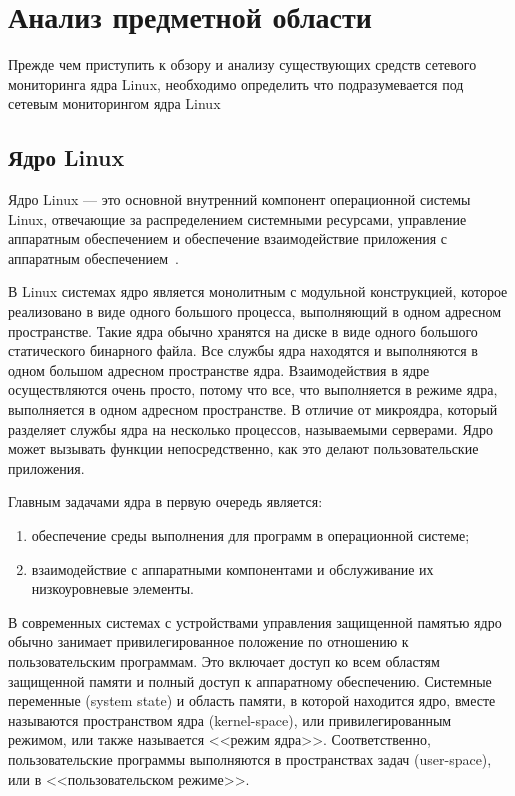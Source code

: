 \chapter{Анализ предметной области}

Прежде чем приступить к обзору и анализу существующих средств сетевого мониторинга ядра Linux, необходимо определить что подразумевается под сетевым мониторингом ядра Linux

\section{Ядро Linux}
Ядро Linux --- это основной внутренний компонент операционной системы Linux, отвечающие за распределением системными ресурсами, управление аппаратным обеспечением и обеспечение взаимодействие приложения с аппаратным обеспечением~\cite{kernel_linux_robert}.

В Linux системах ядро является монолитным с модульной конструкцией, которое реализовано в виде одного большого процесса, выполняющий в одном адресном пространстве.
Такие ядра обычно хранятся на диске в виде одного большого статического бинарного файла.
Все службы ядра находятся и выполняются в одном большом адресном пространстве ядра.
Взаимодействия в ядре осуществляются очень просто, потому что все, что выполняется в режиме ядра, выполняется в одном адресном пространстве.
В отличие от микроядра, который разделяет службы ядра на несколько процессов, называемыми серверами.
Ядро может вызывать функции непосредственно, как это делают пользовательские приложения.

Главным задачами ядра в первую очередь является:
\begin{enumerate}
	\item обеспечение среды выполнения для программ в операционной системе;
	\item взаимодействие с аппаратными компонентами и обслуживание их низкоуровневые элементы.
\end{enumerate}

В современных системах с устройствами управления защищенной памятью ядро обычно занимает привилегированное положение по отношению к пользовательским программам. Это включает доступ ко всем областям защищенной памяти и полный доступ к аппаратному обеспечению. Системные переменные (system state) и область памяти, в которой находится ядро, вместе называются пространством ядра (kernel-space), или привилегированным режимом, или также называется <<режим ядра>>. Соответственно, пользовательские программы выполняются в пространствах задач (user-space), или в <<пользовательском режиме>>.

